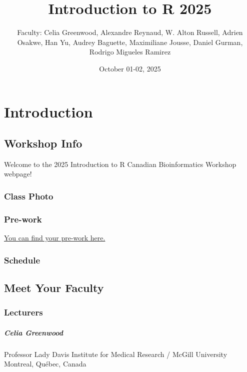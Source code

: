 \documentclass[
]{book}
\title{Introduction to R 2025}
\author{Faculty: Celia Greenwood, Alexandre Reynaud, W. Alton Russell, Adrien Osakwe, Han Yu, Audrey Baguette, Maximiliane Jousse, Daniel Gurman, Rodrigo Migueles Ramirez}
\date{October 01-02, 2025}
\begin{document}
\maketitle

{
\setcounter{tocdepth}{1}
\tableofcontents
}
\part{Introduction}\label{part-introduction}

\chapter{Workshop Info}\label{workshop-info}

Welcome to the 2025 Introduction to R Canadian Bioinformatics Workshop webpage!

\section{Class Photo}\label{class-photo}

\section{Pre-work}\label{pre-work}

\href{https://docs.google.com/forms/d/e/1FAIpQLSdqzz503MPixGxHCbMSvXJCsZyQ8yWG9g1NIO2SexwJL9JUzw/viewform?usp=share_link&ouid=101140812887781190012}{You can find your pre-work here.}

\section{Schedule}\label{schedule}

\chapter{Meet Your Faculty}\label{meet-your-faculty}

\section{Lecturers}\label{lecturers}

\subsubsection{Celia Greenwood}\label{celia-greenwood}

Professor
Lady Davis Institute for Medical Research / McGill University
Montreal, Québec, Canada
\end{document}
